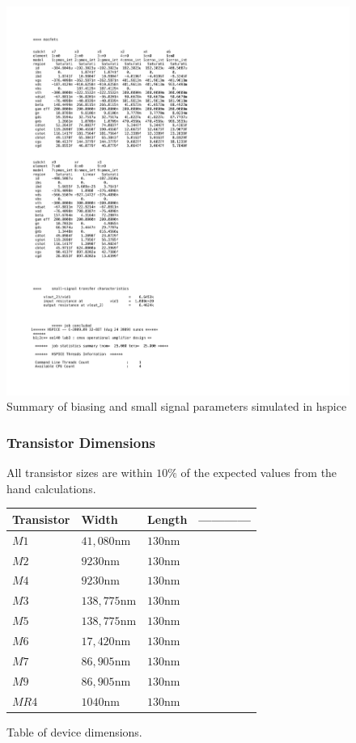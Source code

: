 \documentclass[]{article}
\begin{document}
		\begin{figure}
			\includegraphics[width=1.3\textwidth]{OPERATING_POINT_pg2_FINAL.pdf}
			\caption{Summary of biasing and small signal parameters simulated in hspice}
		\end{figure}
		\newpage
		\begin{center}
			\begin{figure}
				\subsubsection{Transistor Dimensions}
				All transistor sizes are within $10\%$ of the expected values from the hand calculations.
				$$$$
				
  				\begin{tabular}{ | l | l | l | p{5cm} |}
   			 		\hline
   			 		Transistor & Width & Length &------------\\ \hline
   			 		$M1$ & $41,080$nm & $130$nm & \\ \hline
    					$M2$ & $9230$nm & $130$nm & \\ \hline
    					$M4$ & $9230$nm & $130$nm & \\ \hline
					$M3$ & $138,775$nm & $130$nm & \\ \hline
					$M5$ & $138,775$nm & $130$nm & \\ \hline
					$M6$ & $17,420$nm & $130$nm & \\ \hline
					$M7$ & $86,905$nm & $130$nm & \\ \hline
					$M9$ & $86,905$nm & $130$nm & \\ \hline
					$MR$4 & $1040$nm & $130$nm & \\ \hline				
	  			  	\end{tabular}
			\caption{Table of device dimensions.}
			\end{figure}
			\end{center}
			\newpage
			
\end{document}
